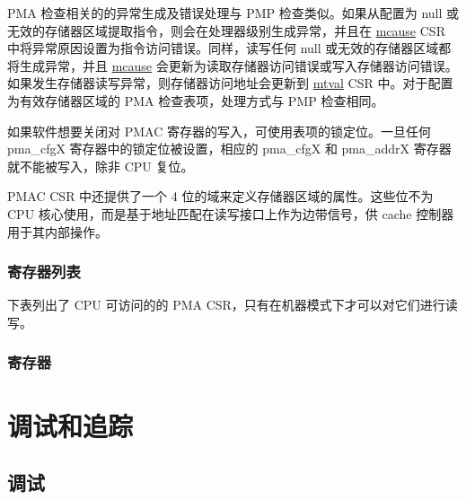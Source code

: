 \documentclass[main\_\_CN.tex]{subfiles}
\begin{document}
PMA 检查相关的的异常生成及错误处理与 PMP 检查类似。如果从配置为 null 或无效的存储器区域提取指令，则会在处理器级别生成异常，并且在 \hyperref[regdesc:MCAUSE]{mcause} CSR 中将异常原因设置为指令访问错误。同样，读写任何 null 或无效的存储器区域都将生成异常，并且 \hyperref[regdesc:MCAUSE]{mcause} 会更新为读取存储器访问错误或写入存储器访问错误。如果发生存储器读写异常，则存储器访问地址会更新到 \hyperref[regdesc:MTVAL]{mtval} CSR 中。对于配置为有效存储器区域的 PMA 检查表项，处理方式与 PMP 检查相同。

如果软件想要关闭对 PMAC 寄存器的写入，可使用表项的锁定位。一旦任何 pma\_cfgX 寄存器中的锁定位被设置，相应的 pma\_cfgX 和 pma\_addrX 寄存器就不能被写入，除非 CPU 复位。

PMAC CSR 中还提供了一个 4 位的域来定义存储器区域的属性。这些位不为 CPU 核心使用，而是基于地址匹配在读写接口上作为边带信号，供 cache 控制器用于其内部操作。


\newpage
\hypertarget{riscvcpu-pma-reg-summ}{}
\subsubsection{寄存器列表}
\label{sec:riscvcpu-pma-reg-summ}

下表列出了 CPU 可访问的的 PMA CSR，只有在机器模式下才可以对它们进行读写。




\subsubsection{寄存器}
\label{sec:riscvcpu-pma-reg-desc}



\newpage
\section{调试和追踪}


\subsection{调试}
\label{sec:riscvcpu-dbg}
\end{document}
